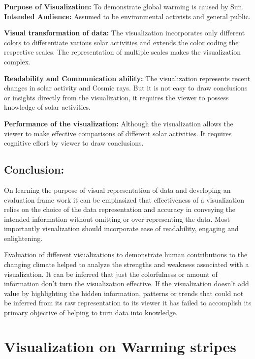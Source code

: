 \documentclass[]{book}
\begin{document}
\textbf{Purpose of Visualization:} To demonstrate global warming is caused by Sun.
\textbf{Intended Audience:} Assumed to be environmental activists and general public.

\textbf{Visual transformation of data:} The visualization incorporates only different colors to differentiate various solar activities and extends the color coding the respective scales. The representation of multiple scales makes the visualization complex.

\textbf{Readability and Communication ability:} The visualization represents recent changes in solar activity and Cosmic rays. But it is not easy to draw conclusions or insights directly from the visualization, it requires the viewer to possess knowledge of solar activities.

\textbf{Performance of the visualization:} Although the visualization allows the viewer to make effective comparisons of different solar activities. It requires cognitive effort by viewer to draw conclusions.

\hypertarget{conclusion}{%
\section{Conclusion:}\label{conclusion}}

On learning the purpose of visual representation of data and developing an evaluation frame work it can be emphasized that effectiveness of a visualization relies on the choice of the data representation and accuracy in conveying the intended information without omitting or over representing the data. Most importantly visualization should incorporate ease of readability, engaging and enlightening.

Evaluation of different visualizations to demonstrate human contributions to the changing climate helped to analyze the strengths and weakness associated with a visualization. It can be inferred that just the colorfulness or amount of information don't turn the visualization effective. If the visualization doesn't add value by highlighting the hidden information, patterns or trends that could not be inferred from its raw representation to its viewer it has failed to accomplish its primary objective of helping to turn data into knowledge.

\hypertarget{visualization-on-warming-stripes}{%
\chapter{Visualization on Warming stripes}\label{visualization-on-warming-stripes}}
\end{document}
